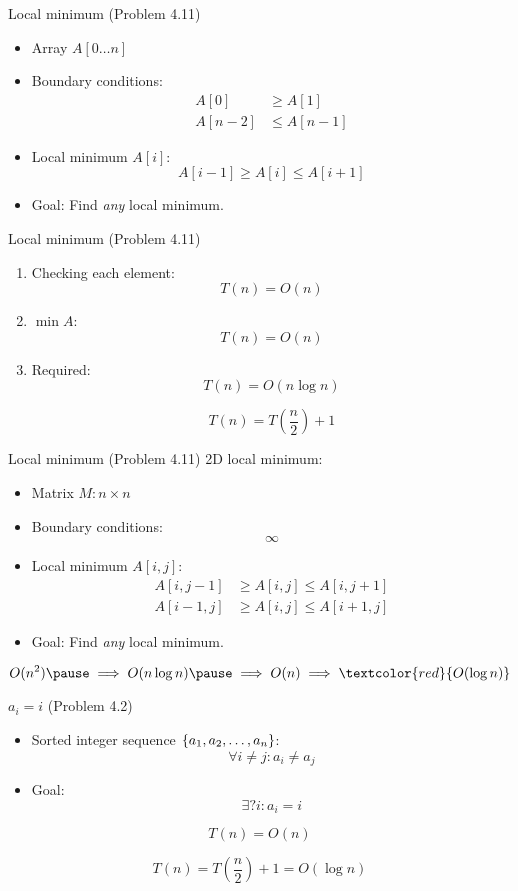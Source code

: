 \begin{frame}{Local minimum (Problem 4.11)}
  \begin{itemize}
	\item Array $A[0 \ldots n]$
	\item Boundary conditions:
	  \begin{align*}
		A[0] &\ge A[1] \\
		A[n-2] &\le A[n-1]
	  \end{align*}
	\item Local minimum $A[i]$:
	  \[
		A[i-1] \ge A[i] \le A[i+1]
	  \]
	\item Goal: Find \emph{any} local minimum.
  \end{itemize}
\end{frame}
\begin{frame}{Local minimum (Problem 4.11)}
  \begin{enumerate}
	\item Checking each element:
	  \[
		T(n) = O(n)
	  \]
	\item $\min A$:
	  \[
		T(n) = O(n)
	  \]
	\pause
	\item Required:
	  \[
		T(n) = O(n \log n)
	  \]

	  \pause
	  \[
		T(n) = T(\frac{n}{2}) + 1
	  \]
  \end{enumerate}
\end{frame}
\begin{frame}{Local minimum (Problem 4.11)}
  2D local minimum:
  \begin{itemize}
	\item Matrix $M: n \times n$
	\item Boundary conditions:
	  \[
		\infty
	  \]
	\item Local minimum $A[i,j]$:
	  \begin{align*}
		A[i,j-1] &\ge A[i,j] \le A[i,j+1] \\
		A[i-1,j] &\ge A[i,j] \le A[i+1,j]
	  \end{align*}
	\item Goal: Find \emph{any} local minimum.
  \end{itemize}

  \pause
  \[
	O(n^2) \pause \implies O(n \log n) \pause \implies O(n) \implies \textcolor{red}{O(\log n)}
  \]
\end{frame}
\begin{frame}{$a_i = i$ (Problem 4.2)}
  \begin{itemize}
	\item Sorted integer sequence $\{a_1, a_2, \ldots, a_n\}$:
	  \[
		\forall i \neq j: a_i \neq a_j
	  \]
	\item Goal: 
	  \[
		\exists? i: a_i = i
	  \]
  \end{itemize}

  \pause
  \[
	T(n) = O(n)
  \]

  \pause
  \[
	T(n) = T(\frac{n}{2}) + 1 = O(\log n)
  \]
\end{frame}
